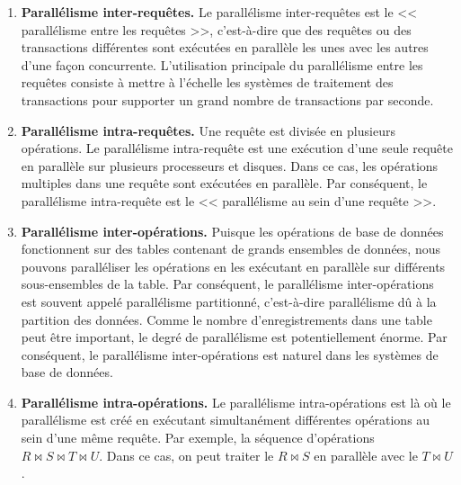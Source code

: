 \begin{enumerate}
 \item \textbf{Parallélisme inter-requêtes.} Le parallélisme inter-requêtes est le << parallélisme entre les requêtes >>, c'est-à-dire que des requêtes ou des transactions différentes sont exécutées en parallèle les unes avec les autres d'une façon concurrente. L'utilisation principale du parallélisme entre les requêtes consiste à mettre à l'échelle les systèmes de traitement des transactions pour supporter un grand nombre de transactions par seconde.
 \item \textbf{Parallélisme intra-requêtes.} Une requête est divisée en plusieurs opérations. Le parallélisme intra-requête est une exécution d'une seule requête en parallèle sur plusieurs processeurs et disques. Dans ce cas, les opérations multiples dans une requête sont exécutées en parallèle. Par conséquent, le parallélisme intra-requête est le << parallélisme au sein d'une requête >>.
 \item \textbf{Parallélisme inter-opérations.} Puisque les opérations de base de données fonctionnent sur des tables contenant de grands ensembles de données, nous pouvons paralléliser les opérations en les exécutant en parallèle sur différents sous-ensembles de la table. Par conséquent, le parallélisme inter-opérations est souvent appelé parallélisme partitionné, c'est-à-dire parallélisme dû à la partition des données. Comme le nombre d'enregistrements dans une table peut être important, le degré de parallélisme est potentiellement énorme. Par conséquent, le parallélisme inter-opérations est naturel dans les systèmes de base de données.
 \item \textbf{Parallélisme intra-opérations.} Le parallélisme intra-opérations est là où le parallélisme est créé en exécutant simultanément différentes opérations au sein d'une même requête. Par exemple, la séquence d'opérations $R \bowtie S \bowtie T \bowtie U$. Dans ce cas, on peut traiter le $R \bowtie S$ en parallèle avec le $T \bowtie U$.
\end{enumerate}

